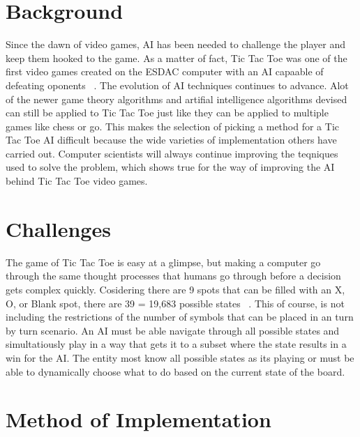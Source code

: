 \documentclass[letterpaper]{article}
\begin{document}
\section{Background}
Since the dawn of video games, AI has been needed to challenge the player and keep them hooked to the game. As a matter of fact, Tic Tac Toe was one of the first video games created on the ESDAC computer with an AI capaable of defeating oponents ~\cite{beck}. The evolution of AI techniques continues to advance. Alot of the newer game theory algorithms and artifial intelligence algorithms devised can still be applied to Tic Tac Toe just like they can be applied to multiple games like chess or go. This makes the selection of picking a method for a Tic Tac Toe AI difficult because the wide varieties of implementation others have carried out. Computer scientists will always continue improving the teqniques used to solve the problem, which shows true for the way of improving the AI behind Tic Tac Toe video games.

\section{Challenges}
The game of Tic Tac Toe is easy at a glimpse, but making a computer go through the same thought processes that humans go through before a decision gets complex quickly. Cosidering there are 9 spots that can be filled with an X, O, or Blank spot, there are 39  = 19,683 possible states ~\cite {garg_2017}. This of course, is not including the restrictions of the number of symbols that can be placed in an turn by turn scenario. An AI must be able navigate through all possible states and simultatiously play in a way that gets it to a subset where the state results in a win for the AI. The entity most know all possible states as its playing or must be able to dynamically choose what to do based on the current state of the board.

\section{Method of Implementation}
\end{document}
